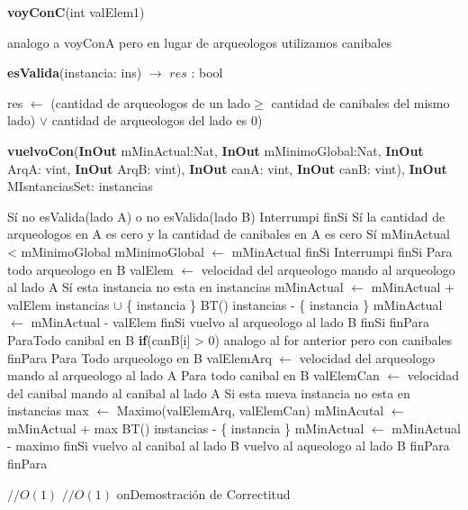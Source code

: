 \documentclass[spanish,12pt]{article}
\begin{document}
\begin{algorithm}[H]{\textbf{voyConC}(int valElem1)}
	\begin{algorithmic}
		\State  analogo a voyConA pero en lugar de arqueologos utilizamos canibales
	\end{algorithmic}
\end{algorithm}
 	
\begin{algorithm}[H]{\textbf{esValida}(instancia: ins) $\to$ $res$ : bool }
	\begin{algorithmic}
	 res $\gets$ (cantidad de arqueologos de un lado$\geq$ cantidad de canibales del mismo lado) $\lor$ cantidad de arqueologos del lado es 0)
	\end{algorithmic}
\end{algorithm}


\begin{algorithm}[H]{\textbf{vuelvoCon}(\textbf{InOut} mMinActual:Nat, \textbf{InOut} mMinimoGlobal:Nat, \textbf{InOut} ArqA: vint, \textbf{InOut} ArqB: vint), \textbf{InOut} canA: vint, \textbf{InOut} canB: vint), \textbf{InOut} MIsntanciasSet: instancias}
	\begin{algorithmic}
	\State Sí no esValida(lado A) o no esValida(lado B)	
	\State \quad Interrumpi
	\State finSi
	\State Sí la cantidad de arqueologos en A es cero y la cantidad de canibales en A es cero
	\State \quad Sí mMinActual < mMinimoGlobal
	\State \qquad mMinimoGlobal $\gets$ mMinActual
	\State \quad finSi
	\State  \quad Interrumpi
	\State finSi
	\State Para todo arqueologo en B 
	\State \qquad valElem $\gets$ velocidad del arqueologo
	\State \qquad mando al arqueologo al lado A	
	\State \qquad Sí esta instancia no esta en instancias
	\State \qquad \quad mMinActual $\gets$ mMinActual + valElem
	\State \qquad \quad instancias $\cup$ \{ instancia \}
	\State \qquad \quad BT()
	\State \qquad \quad instancias - \{ instancia \}
	\State \qquad \quad mMinActual $\gets$ mMinActual - valElem
	\State \qquad finSi
	\State \qquad vuelvo al arqueologo al lado B
	\State \quad finSi
	\State finPara
	\State ParaTodo canibal en B
	\State \quad \textbf{if}(canB[i] > 0)
	\State \qquad analogo al for anterior pero con canibales
	\State finPara
	\State Para Todo arqueologo en B 
	\State \quad valElemArq $\gets$ velocidad del arqueologo 
	\State \qquad mando al arqueologo al lado A
	\State \qquad Para todo canibal en B
	\State \qquad \quad valElemCan $\gets$ velocidad del canibal	
	\State \qquad \qquad mando al canibal al lado A
	\State \qquad \qquad Si esta nueva instancia no esta en instancias
	\State \qquad \qquad \quad max $\gets$ Maximo(valElemArq, valElemCan)
	\State \qquad \qquad \quad mMinAcutal $\gets$ mMinActual + max
	\State \qquad \qquad \quad BT()
	\State \qquad \qquad \quad instancias - \{ instancia \}
	\State \qquad \qquad \quad mMinActual $\gets$ mMinActual - maximo
	\State \qquad \qquad finSi
	\State \qquad \qquad vuelvo al canibal al lado B
	\State \qquad vuelvo al aqueologo al lado B 
	\State \qquad finPara
	\State finPara
																		
	\end{algorithmic}
\end{algorithm}
 $//O(1)$
 $//O(1)$
\subsecti on{Demostración de Correctitud}
\end{document}
